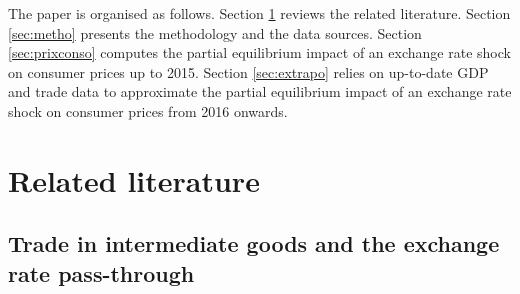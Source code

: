 \documentclass[11pt,a4paper]{article}
\begin{document}

The paper is organised as follows.
Section \ref{sec:lit} reviews the related literature.
Section \ref{sec:metho} presents the methodology and the data sources.
Section \ref{sec:prixconso} computes the partial equilibrium impact of an exchange rate shock on consumer prices up to 2015. 
Section \ref{sec:extrapo} relies on up-to-date GDP and trade data to approximate the partial equilibrium impact of an exchange rate shock on consumer prices from 2016 onwards.


\label{sec:intro}


\section{Related literature}
\label{sec:lit}

\subsection{Trade in intermediate goods and the exchange rate pass-through} 
\end{document}
